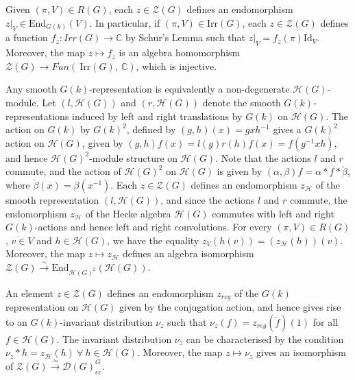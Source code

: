 \documentclass[11 pt]{article}
\numberwithin{equation}{subsection}
\theoremstyle{definition}
\theoremstyle{remark}
\theoremstyle{conjecture}
\newcommand{\Irr}{\mathrm{Irr}}
\newcommand{\Id}{\mathrm{Id}}
\newcommand{\C}{\mathbb C}
\newcommand{\HH}{\mathcal H}
\newcommand{\ZZ}{\mathcal{Z}}
\newcommand{\mc}{\mathcal}
\begin{document}
Given $(\pi, V) \in R(G)$, each $z\in \ZZ(G)$ defines an endomorphism $z|_V \in \text{End}_{G( k)}(V)$. In particular, if $(\pi, V) \in \Irr(G)$, each $z\in \ZZ(G)$ defines a function $f_z :Irr(G)  \rightarrow \C$ by Schur's Lemma such that $z|_V=f_z(\pi)\Id_V$. Moreover, the map $z\mapsto f_z$ is an algebra homomorphism $\ZZ(G) \rightarrow Fun(\: \Irr(G), \: \C)$, which is injective. \par
  Any smooth $G( k)$-representation is equivalently a non-degenerate $\HH(G)$-module. Let $(l, \HH(G))$ and $(r,\HH(G))$ denote the smooth $G( k)$-representations induced by left and right translations by $G( k)$ on $\HH(G)$. The action on $G( k)$ by $G( k)^2$, defined by $(g,h)(x)=gxh^{-1}$ gives a $G( k)^2$ action on $\HH(G)$, given by $(g,h)f(x)=l(g)r(h)f(x)= f(g^{-1}xh)$, and hence $\HH(G)^2$-module structure on $\HH(G)$. Note that the actions $l$ and $r$ commute, and the action of $\HH(G)^2$ on $\HH(G)$ is given by $(\alpha, \beta)f= \alpha * f* \breve \beta$, where $\breve\beta(x)=\beta(x^{-1})$. Each $z\in \ZZ(G)$ defines an endomorphism $z_\HH$ of the smooth representation $(l, \HH(G))$, and since the actions $l$ and $r$ commute, the endomorphism $z_\HH$ of the  Hecke algebra $\HH(G)$ commutes with left and right $G( k)$-actions and hence left and right convolutions. For every $(\pi, V) \in R(G)$, $v\in V$ and $h\in \HH(G)$, we have the equality $z_V(h(v))=(z_\HH(h))(v)$. Moreover, the map $z\mapsto z_\HH$ defines an algebra isomorphism $\ZZ(G) \xrightarrow{\sim} \text{End}_{\HH(G)^{2}}(\HH(G))$. \par

An element $z\in \ZZ(G)$ defines an endomorphism $z_{reg}$ of the $G( k)$ representation on $\HH(G)$ given by the conjugation action, and hence gives rise to an $G( k)$-invariant distribution $\nu_z$ such that $\nu_z(f)=z_{reg}(\breve f)(1) $ for all $f\in \HH(G)$. The invariant distribution $\nu_z$ can be characterised by the condition $\nu_z * h = z_\HH(h) \: \forall \: h\in \HH(G)$. Moreover, the map $z \mapsto \nu_z$ gives an isomorphism of $\ZZ(G)\xrightarrow{\simeq}\mc D(G)^G_{ec}$. \par
\end{document}
